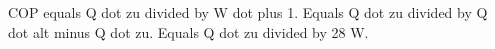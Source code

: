 COP equals Q dot zu divided by W dot plus 1.  
Equals Q dot zu divided by Q dot alt minus Q dot zu.  
Equals Q dot zu divided by 28 W.